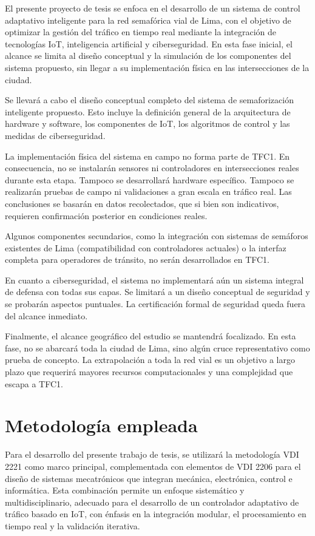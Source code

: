 \documentclass[12pt,a4paper,oneside]{report}
\begin{document}
El presente proyecto de tesis se enfoca en el desarrollo de un sistema de control adaptativo inteligente para la red semafórica vial de Lima, con el objetivo de optimizar la gestión del tráfico en tiempo real mediante la integración de tecnologías IoT, inteligencia artificial y ciberseguridad. En esta fase inicial, el alcance se limita al diseño conceptual y la simulación de los componentes del sistema propuesto, sin llegar a su implementación física en las intersecciones de la ciudad.

Se llevará a cabo el diseño conceptual completo del sistema de semaforización inteligente propuesto. Esto incluye la definición general de la arquitectura de hardware y software, los componentes de IoT, los algoritmos de control y las medidas de ciberseguridad.

La implementación física del sistema en campo no forma parte de TFC1. En consecuencia, no se instalarán sensores ni controladores en intersecciones reales durante esta etapa. Tampoco se desarrollará hardware específico. Tampoco se realizarán pruebas de campo ni validaciones a gran escala en tráfico real. Las conclusiones se basarán en datos recolectados, que si bien son indicativos, requieren confirmación posterior en condiciones reales.

Algunos componentes secundarios, como la integración con sistemas de semáforos existentes de Lima (compatibilidad con controladores actuales) o la interfaz completa para operadores de tránsito, no serán desarrollados en TFC1.

En cuanto a ciberseguridad, el sistema no implementará aún un sistema integral de defensa con todas sus capas. Se limitará a un diseño conceptual de seguridad y se probarán aspectos puntuales. La certificación formal de seguridad queda fuera del alcance inmediato.

Finalmente, el alcance geográfico del estudio se mantendrá focalizado. En esta fase, no se abarcará toda la ciudad de Lima, sino algún cruce representativo como prueba de concepto. La extrapolación a toda la red vial es un objetivo a largo plazo que requerirá mayores recursos computacionales y una complejidad que escapa a TFC1.

\section{Metodología empleada}\label{metodologuxeda-empleada}

Para el desarrollo del presente trabajo de tesis, se utilizará la metodología VDI 2221 como marco principal, complementada con elementos de VDI 2206 para el diseño de sistemas mecatrónicos que integran mecánica, electrónica, control e informática. Esta combinación permite un enfoque sistemático y multidisciplinario, adecuado para el desarrollo de un controlador adaptativo de tráfico basado en IoT, con énfasis en la integración modular, el procesamiento en tiempo real y la validación iterativa.
\end{document}

